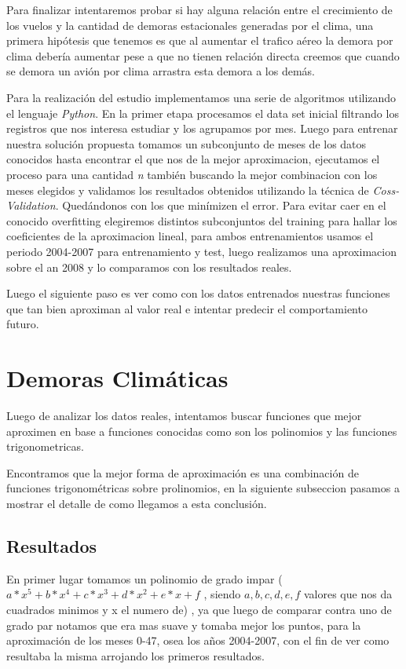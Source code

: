 \documentclass{endm}
\begin{document}
Para finalizar intentaremos probar si hay alguna relaci\'on entre el crecimiento de los vuelos y la cantidad de demoras estacionales generadas por el clima, una primera hip\'otesis que tenemos es que al aumentar el trafico aéreo la demora por clima deber\'ia aumentar pese a que no tienen relaci\'on directa creemos que cuando se demora un avi\'on por clima arrastra esta demora a los dem\'as.

Para la realizaci\'on del estudio implementamos una serie de algoritmos utilizando el lenguaje \textit{Python}. En la primer etapa procesamos el data set inicial filtrando los registros que nos interesa estudiar y los agrupamos por mes. Luego para entrenar nuestra soluci\'on propuesta tomamos un subconjunto de meses de los datos conocidos hasta encontrar el que nos de la mejor aproximacion, ejecutamos el proceso para una cantidad \textit{n} tambi\'en buscando la mejor combinacion con los meses elegidos y validamos los resultados obtenidos utilizando la t\'ecnica de \textit{Coss-Validation}. Qued\'andonos con los que min\'imizen el error. Para evitar caer en el conocido overfitting elegiremos distintos subconjuntos del training para hallar los coeficientes de la aproximacion lineal, para ambos entrenamientos usamos el periodo 2004-2007 para entrenamiento y test,  luego realizamos una aproximacion sobre el a\˜n 2008 y lo comparamos con los resultados reales.

Luego el siguiente paso es ver como con los datos entrenados nuestras funciones que tan bien aproximan al valor real e intentar predecir el comportamiento futuro.


\section{Demoras Clim\'aticas}
Luego de analizar los datos reales, intentamos buscar funciones que mejor aproximen en base a funciones conocidas como son los polinomios y las funciones trigonometricas.

Encontramos que la mejor forma de aproximaci\'on es una combinaci\'on de funciones trigonom\'etricas sobre prolinomios, en la siguiente subseccion pasamos a mostrar el detalle de como llegamos a esta conclusi\'on.

\subsection{Resultados}
En primer lugar tomamos un polinomio de grado impar ($a*x^5+b*x^4+c*x^3+d*x^2+e*x+f$ , siendo $a,b,c,d,e,f$ valores que nos da cuadrados minimos y x el numero de) , ya que luego de comparar contra uno de grado par notamos que era mas suave y tomaba mejor los puntos, para la aproximaci\'on de los meses 0-47, osea los años 2004-2007, con el fin de ver como resultaba la misma arrojando los primeros resultados.
\end{document}
